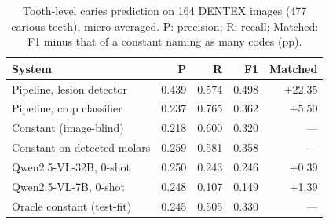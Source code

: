 \documentclass[conference]{IEEEtran}
\begin{document}
\begin{table}[t]
\centering
\caption{Tooth-level caries prediction on 164 DENTEX images (477 carious teeth), micro-averaged. P: precision; R: recall; Matched: F1 minus that of a constant naming as many codes (pp).}
\label{tab:5}
\footnotesize
\setlength{\tabcolsep}{3pt}
\begin{tabular}{>{\raggedright\arraybackslash}p{3.82cm}rrrr}
\toprule
System & P & R & F1 & Matched \\
\midrule
Pipeline, lesion detector & 0.439 & 0.574 & 0.498 & +22.35 \\
Pipeline, crop classifier & 0.237 & 0.765 & 0.362 & +5.50 \\
Constant (image-blind) & 0.218 & 0.600 & 0.320 & — \\
Constant on detected molars & 0.259 & 0.581 & 0.358 & — \\
Qwen2.5-VL-32B, 0-shot & 0.250 & 0.243 & 0.246 & +0.39 \\
Qwen2.5-VL-7B, 0-shot & 0.248 & 0.107 & 0.149 & +1.39 \\
Oracle constant (test-fit) & 0.245 & 0.505 & 0.330 & — \\
\bottomrule
\end{tabular}
\end{table}
\end{document}
